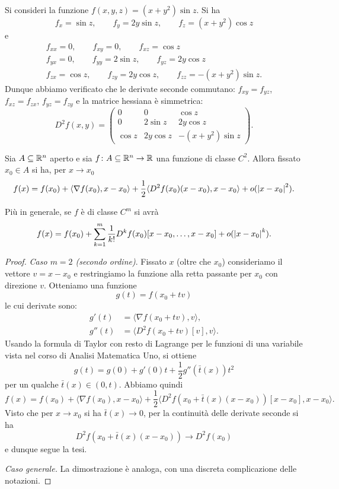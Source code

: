 \begin{example}
Si consideri la funzione $f(x,y,z) = (x+y^2) \sin z$.
Si ha
\[
 f_x = \sin z, \qquad
 f_y = 2 y \sin z, \qquad
 f_z = (x+y^2)\cos z
\]
e
\begin{gather*}
  f_{xx} = 0, \qquad
  f_{xy} = 0, \qquad 
  f_{xz} = \cos z \\
  f_{yx} = 0, \qquad 
  f_{yy} = 2 \sin z, \qquad
  f_{yz} = 2y \cos z\\
  f_{zx} = \cos z, \qquad
  f_{zy} = 2y\cos z, \qquad
  f_{zz} = -(x+y^2)\sin z.
\end{gather*}
Dunque abbiamo verificato che le derivate 
seconde commutano: $f_{xy}=f_{yz}$, $f_{xz}=f_{zx}$,
$f_{yz}=f_{zy}$
e la matrice hessiana è simmetrica:
\[
 D^2 f(x,y) = \begin{pmatrix}
  0 & 0 & \cos z\\
  0 & 2\sin z & 2y \cos z \\
  \cos z & 2y \cos z & -(x+y^2)\sin z
 \end{pmatrix}.
\]
\end{example}

\begin{theorem}
Sia $A\subseteq {\mathbb R}^n$ aperto e 
sia $f\colon A\subseteq {\mathbb R}^n \to {\mathbb R}$ una funzione di classe $C^2$.
Allora fissato $ x_0\in A$ si ha, per $ x \to  x_0$
\begin{equation}\label{eq:taylor_secondo}
  f( x) = f( x_0) + \langle \nabla f( x_0),  x -  x_0\rangle 
  + \frac 1 2 \langle D^2 f( x_0) ( x -  x_0),  x -  x_0\rangle
  + o({\left| x -  x_0\right|}^2).
\end{equation}

Più in generale, se $f$ è di classe $C^m$ si avrà
\[
 f(x) = f(x_0) + \sum_{k=1}^m \frac 1 {k!} D^k f(x_0)[x- x_0, \dots, x-x_0]
  + o({\left| x -  x_0\right|}^k).
\]
\end{theorem}
%
\begin{proof}
\emph{Caso $m=2$ (secondo ordine)}.
Fissato $ x$ (oltre che $ x_0$) consideriamo 
il vettore $ v =  x -  x_0$ e restringiamo la funzione 
alla retta passante per $ x_0$ con direzione $ v$.
Otteniamo una funzione 
\[
  g(t) = f( x_0 + t  v)
\]
le cui derivate sono:
\begin{align*}
  g'(t) &= \langle \nabla f( x_0 + t v),  v\rangle,\\
  g''(t) &= \langle D^2 f( x_0+t v)[v],  v \rangle.
\end{align*}
Usando la formula di Taylor con resto di Lagrange per le funzioni di una variabile vista nel 
corso di Analisi Matematica Uno, si ottiene
\[
  g(t) = g(0) + g'(0) t + \frac 1 2 g''(\bar t( x)) t^2
\]
per un qualche $\bar t( x)\in (0,t)$. 
Abbiamo quindi 
\[
  f( x) = f( x_0) + \langle \nabla f(x_0),  x -  x_0\rangle 
  + \frac 1 2 \langle D^2 f( x_0 + \bar t( x)(x -  x_0))[x- x_0],  x- x_0\rangle.
\]
Visto che per $ x \to  x_0$ si ha $\bar t( x)\to 0$,
per la continuità delle derivate seconde
si ha 
\[
  D^2 f( x_0 + \bar t( x)( x -  x_0))
  \to D^2 f( x_0)
\]
e dunque segue la tesi.

\emph{Caso generale.}
La dimostrazione è analoga, con una discreta complicazione delle notazioni.
\end{proof}

